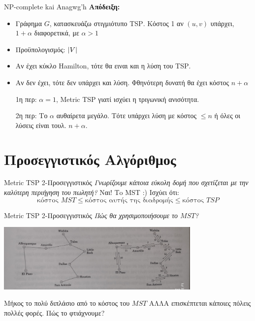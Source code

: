 \documentclass{beamer}
\DeclarePairedDelimiter{\abs}{\lvert}{\rvert}
\begin{document}
\begin{frame}{\textlatin{NP-complete} kai Anagwg'h}
\textbf{Απόδειξη:}
\begin{itemize}
    \item Γράφημα $G$, κατασκευάζω στιγμιότυπο \textlatin{TSP}. Κόστος 1 αν $(u,v)$ υπάρχει, $1+α$ διαφορετικά, με $α>1$ 
    \item Προϋπολογισμός: $\abs V$
    \item Αν έχει κύκλο \textlatin{Hamilton}, τότε θα ειναι και η λύση του \textlatin{TSP}.
    \item Αν δεν έχει, τότε δεν υπάρχει και λύση. Φθηνότερη δυνατή θα έχει κόστος $n+α$
    
\end{itemize}
\begin{itemize}
    \item[1η περ:] $α=1$, \textlatin{Metric TSP} γιατί ισχύει η τριγωνική ανισότητα. 
    \item[2η περ:] Το $α$ αυθαίρετα μεγάλο. Τότε υπάρχει λύση με κόστος $\leq n$ ή όλες οι λύσεις είναι τουλ. $n+α$.
\end{itemize}

\end{frame}


\section{Προσεγγιστικός Αλγόριθμος}
\begin{frame}{\textlatin{Metric TSP 2-Προσεγγιστικός}}
\emph{Γνωρίζουμε κάποια εύκολη δομή που σχετίζεται με την καλύτερη περιήγηση του πωλητή?} \newline
Ναι! Τo \textlatin{MST} :) \newline \newline
Ισχύει ότι:
$$\text{κόστος } MST \leq \text{κόστος αυτής της διαδρομής} \leq \text{κόστος }  TSP$$
\end{frame}

\begin{frame}{\textlatin{Metric TSP 2-Προσεγγιστικός}}
\emph{Πώς θα χρησιμοποιήσουμε το $MST$?}
\begin{center}
    \includegraphics[width=10cm]{example.jpg}
\end{center}
Μήκος το πολύ διπλάσιο από το κόστος του $MST$ \newline ΑΛΛΑ επισκέπτεται κάποιες πόλεις πολλές φορές. Πώς το φτιάχνουμε?
\end{frame}
\end{document}
